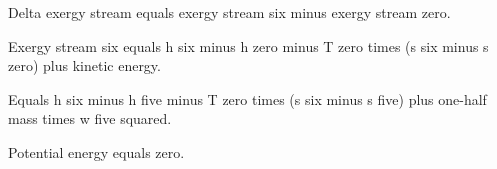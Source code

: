 Delta exergy stream equals exergy stream six minus exergy stream zero.  

Exergy stream six equals h six minus h zero minus T zero times (s six minus s zero) plus kinetic energy.  

Equals h six minus h five minus T zero times (s six minus s five) plus one-half mass times w five squared.  

Potential energy equals zero.